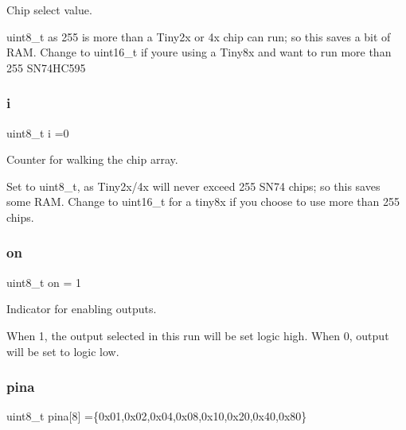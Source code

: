 Chip select value. 

uint8\+\_\+t as 255 is more than a Tiny2x or 4x chip can run; so this saves a bit of R\+AM. Change to uint16\+\_\+t if you\textquotesingle{}re using a Tiny8x and want to run more than 255 S\+N74\+H\+C595 \mbox{\label{SN74__RandomBlink_8ino_af27e3188294c2df66d975b74a09c001d}} 
\subsubsection{\texorpdfstring{i}{i}}
{\footnotesize\ttfamily uint8\+\_\+t i =0}



Counter for walking the chip array. 

Set to uint8\+\_\+t, as Tiny2x/4x will never exceed 255 S\+N74 chips; so this saves some R\+AM. Change to uint16\+\_\+t for a tiny8x if you choose to use more than 255 chips. \mbox{\label{SN74__RandomBlink_8ino_a6dc166123fed68e9b34a2512623163e0}} 
\subsubsection{\texorpdfstring{on}{on}}
{\footnotesize\ttfamily uint8\+\_\+t on = 1}



Indicator for enabling outputs. 

When 1, the output selected in this run will be set logic high. When 0, output will be set to logic low. \mbox{\label{SN74__RandomBlink_8ino_a74fac0365dddec359ec40da99dde9d8a}} 
\subsubsection{\texorpdfstring{pina}{pina}}
{\footnotesize\ttfamily uint8\+\_\+t pina\mbox{[}8\mbox{]} =\{0x01,0x02,0x04,0x08,0x10,0x20,0x40,0x80\}}



